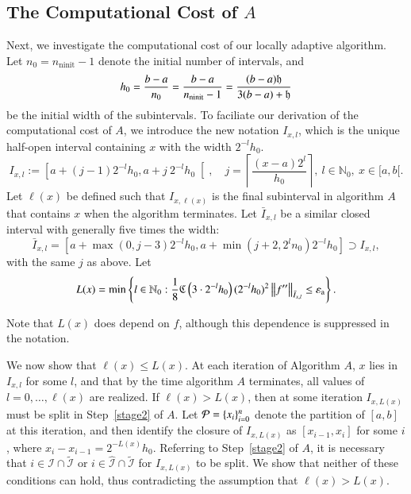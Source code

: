 \documentclass[review]{elsarticle}
\newcommand{\abstol}{\varepsilon_{\textrm{a}}}
\theoremstyle{definition}
\newcommand{\Ixl}{I_{x,l}}
\DeclareMathOperator{\ninit}{ninit}
\begin{document}
\subsection{The Computational Cost of $A$} \label{subsec:appxcost}

Next, we investigate the computational cost of our locally adaptive algorithm. Let $n_0= n_{\ninit} -1$ denote the initial number of intervals, and
 \[
 h_0=\frac{b-a}{n_0} = \frac{b-a}{n_{\ninit}-1} = \frac{(b-a)\fh}{3(b-a)+\fh}
 \]
be the initial width of the subintervals. To faciliate our derivation of the computational cost of $A$, we introduce the new notation $\Ixl$, which is the unique half-open interval containing $x$ with
 the width $2^{-l}h_0$.
\[\Ixl :=\left[a+(j-1)2^{-l}h_0,a+j \ 2^{-l}h_0\right[, \quad j=\left\lceil\frac{(x-a)2^l}{h_0}\right\rceil, \ l \in \mathbb{N}_0, \ x \in [a,b[.\]
Let
$\ell(x)$ be defined such that
$I_{x,\ell(x)}$ is the final subinterval in algorithm $A$ that contains $x$ when the algorithm terminates.
Let $\bar{I}_{x,l}$ be a similar closed interval with generally five times the width:
\[\bar{I}_{x,l}=\left[a+\max(0,j-3)2^{-l}h_0, a+ \min(j+2,2^ln_0)2^{-l}h_0\right] \supset \Ixl,
\] with the same $j$ as above.  Let
\begin{equation}\label{eqn:defoflx}
L(x) = \min \left\{ l \in \mathbb{N}_0 :  \frac{1}{8} \fC\left(3\cdot2^{-l}h_0\right)(2^{-l}h_0)^2\norm[\bar{I}_{x,l}]{f''} \le \abstol \right\}.
\end{equation}

Note that $L(x)$ does depend on $f$, although this dependence is suppressed in the notation.

We now show that $\ell(x) \le L(x)$.  At each iteration of Algorithm $A$, $x$ lies in $\Ixl$ for some $l$, and that by the time algorithm $A$ terminates, all values of $l = 0, \ldots, \ell(x)$ are realized.  If $\ell(x) > L(x)$, then at some iteration $I_{x,L(x)}$ must be split in Step~\ref{stage2} of $A$.  Let $\mathcal{P} = \{x_i\}_{i=0}^n$ denote the partition of $[a,b]$ at this iteration, and then identify the closure of $I_{x,L(x)}$ as $[x_{i-1},x_i]$ for some $i$, where $x_i-x_{i-1}=2^{-L(x)}h_0$.
Referring to Step~\ref{stage2} of $A$, it is necessary that $i \in \mathcal{I} \cap \widetilde{\mathcal{I}}$ or  $i \in \widehat{\mathcal{I}}\cap \widetilde{\mathcal{I}}$ for $I_{x,L(x)}$ to be split.  We show that neither of these conditions can hold, thus contradicting the assumption that $\ell(x) > L(x)$.
\end{document}
